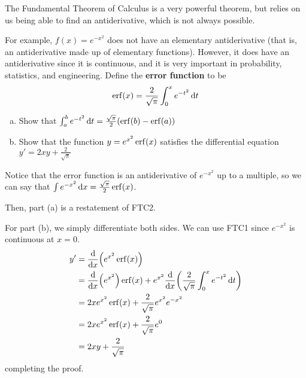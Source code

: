 \documentclass{agony}
\begin{document}
\begin{prob}
  The Fundamental Theorem of Calculus is a very powerful theorem,
  but relies on us being able to find an antiderivative,
  which is not always possible.

  For example, $f(x) = e^{-x^2}$ does not have an elementary antiderivative
  (that is, an antiderivative made up of elementary functions).
  However, it does have an antiderivative since it is continuous,
  and it is very important in probability, statistics, and engineering.
  Define the \textbf{error function} to be
  \[ \erf(x) = \frac{2}{\sqrt{\pi}}\int_0^x e^{-t^2} \dd{t} \]
  \begin{enumerate}[(a)]
    \item Show that
          $\int_a^b e^{-t^2} \dd{t} = \frac{\sqrt{\pi}}{2}(\erf(b)-\erf(a))$
    \item Show that the function $y = e^{x^2}\erf(x)$ satisfies
          the differential equation $y' = 2xy + \frac{2}{\sqrt{\pi}}$
  \end{enumerate}
\end{prob}
\begin{sol}
  Notice that the error function is an antiderivative of $e^{-x^2}$ up to a multiple,
  so we can say that $\int e^{-x^2} \dd{x} = \frac{\sqrt{\pi}}{2}\erf(x)$.

  Then, part (a) is a restatement of FTC2.

  For part (b), we simply differentiate both sides.
  We can use FTC1 since $e^{-x^2}$ is continuous at $x=0$.
  \begin{align*}
    y' & = \dv{x}(e^{x^2}\erf(x))                                                               \\
       & = \dv{x}(e^{x^2})\erf(x) + e^{x^2}\dv{x}(\frac{2}{\sqrt{\pi}}\int_0^x e^{-t^2} \dd{t}) \\
       & = 2xe^{x^2}\erf(x) + \frac{2}{\sqrt{\pi}}e^{x^2}e^{-x^2}                               \\
       & = 2xe^{x^2}\erf(x) + \frac{2}{\sqrt{\pi}}e^0                                           \\
       & = 2xy + \frac{2}{\sqrt{\pi}}
  \end{align*}
  completing the proof.
\end{sol}
\end{document}
